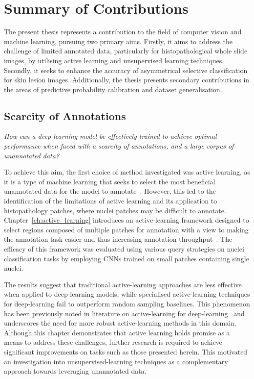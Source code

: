 \section{Summary of Contributions}
The present thesis represents a contribution to the field of computer vision and machine learning, pursuing two primary aims. Firstly, it aims to address the challenge of limited annotated data, particularly for histopathological whole slide images, by utilising active learning and unsupervised learning techniques. Secondly, it seeks to enhance the accuracy of asymmetrical selective classification for skin lesion images. Additionally, the thesis presents secondary contributions in the areas of predictive probability calibration and dataset generalisation.

\subsection{Scarcity of Annotations}
\textit{How can a deep learning model be effectively trained to achieve optimal performance when faced with a scarcity of annotations, and a large corpus of unannotated data?}

To achieve this aim, the first choice of method investigated was active learning, as it is a type of machine learning that seeks to select the most beneficial unannotated data for the model to annotate~\citep{settles2009active}. However, this led to the identification of the limitations of active learning and its application to histopathology patches, where nuclei patches may be difficult to annotate. Chapter~\ref{ch:active_learning} introduces an active-learning framework designed to select regions composed of multiple patches for annotation with a view to making the annotation task easier and thus increasing annotation throughput~\citep{carse2019active}. The efficacy of this framework was evaluated using various query strategies on nuclei classification tasks by employing CNNs trained on small patches containing single nuclei. 

The results suggest that traditional active-learning approaches are less effective when applied to deep-learning models, while specialised active-learning techniques for deep-learning fail to outperform random sampling baselines. This phenomenon has been previously noted in literature on active-learning for deep-learning~\citep{ren2021survey} and underscores the need for more robust active-learning methods in this domain. Although this chapter demonstrates that active learning holds promise as a means to address these challenges, further research is required to achieve significant improvements on tasks such as those presented herein. This motivated an investigation into unsupervised-learning techniques as a complementary approach towards leveraging unannotated data.

